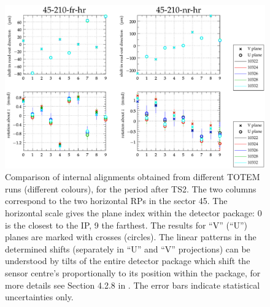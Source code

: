 \documentclass[TOTEM]{cern/cernphprep}
\begin{document}
\begin{figure}[h!]
\begin{center}
\includegraphics[width=\hsize]{fig/after_TS2/plots_per_plane_left.pdf}
\caption{%
Comparison of internal alignments obtained from different TOTEM runs (different colours), for the period after TS2. The two columns correspond to the two horizontal RPs in the sector 45. The horizontal scale gives the plane index within the detector package: 0 is the closest to the IP, 9 the farthest. The results for ``V'' (``U'') planes are marked with crosses (circles). The linear patterns in the determined shifts (separately in ``U'' and ``V'' projections) can be understood by tilts of the entire detector package which shift the sensor centre's proportionally to its position within the package, for more details see Section 4.2.8 in \cite{jan_thesis}. The error bars indicate statistical uncertainties only.
}
\label{fig:tb_example_internal}
\end{center}
\end{figure}
\end{document}
